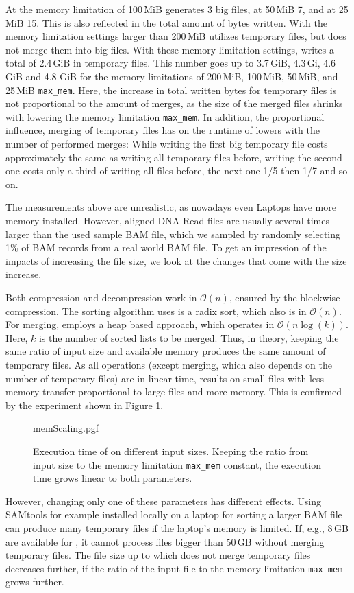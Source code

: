 At the memory limitation of 100\,MiB \sort generates 3 big files, at 50\,MiB 7, and at 25\,MiB 15. This is also reflected in the total amount of bytes written. With the memory limitation settings larger than 200\,MiB \sort utilizes temporary files, but does not merge them into big files. With these memory limitation settings, \sort writes a total of 2.4\,GiB in temporary files. This number goes up to 3.7\,GiB, 4.3\,Gi, 4.6\,GiB and 4.8 GiB for the memory limitations of 200\,MiB, 100\,MiB, 50\,MiB, and 25\,MiB \texttt{max\_mem}. Here, the increase in total written bytes for temporary files is not proportional to the amount of merges, as the size of the merged files shrinks with lowering the memory limitation \texttt{max\_mem}. In addition, the proportional influence, merging of temporary files has on the runtime of \sort lowers with the number of performed merges: While writing the first big temporary file costs approximately the same as writing all temporary files before, writing the second one costs only a third of writing all files before, the next one 1/5 then 1/7 and so on.

The measurements above are unrealistic, as nowadays even Laptops have more memory installed. However, aligned DNA-Read files are usually several times larger than the used sample BAM file, which we sampled by randomly selecting 1\% of BAM records from a real world BAM file. To get an impression of the impacts of increasing the file size, we look at the changes that come with the size increase. 

Both compression and decompression work in $\mathcal{O}(n)$, ensured by the blockwise compression. The sorting algorithm \sort uses is a radix sort, which also is in $\mathcal{O}(n)$. For merging, \sort employs a heap based approach, which operates in $\mathcal{O}(n \log(k))$. Here, $k$ is the number of sorted lists to be merged. Thus, in theory, keeping the same ratio of input size and available memory produces the same amount of temporary files. As all operations (except merging, which also depends on the number of temporary files) are in linear time, results on small files with less memory transfer proportional to large files and more memory. This is confirmed by the experiment shown in Figure \ref{fig:memScaling}.

\begin{figure}[h]
        {memScaling.pgf}
    \caption{Execution time of \sort on different input sizes. Keeping the ratio from input size to the memory limitation \texttt{max\_mem} constant, the execution time grows linear to both parameters. \points}
    \label{fig:memScaling}
\end{figure}
However, changing only one of these parameters has different effects. Using SAMtools for example installed locally on a laptop for sorting a larger BAM file can produce many temporary files if the laptop's memory is limited. If, e.g., 8\,GB are available for \sort, it cannot process files bigger than 50\,GB without merging temporary files. The file size up to which \sort does not merge temporary files decreases further, if the ratio of the input file to the memory limitation \texttt{max\_mem} grows further.

